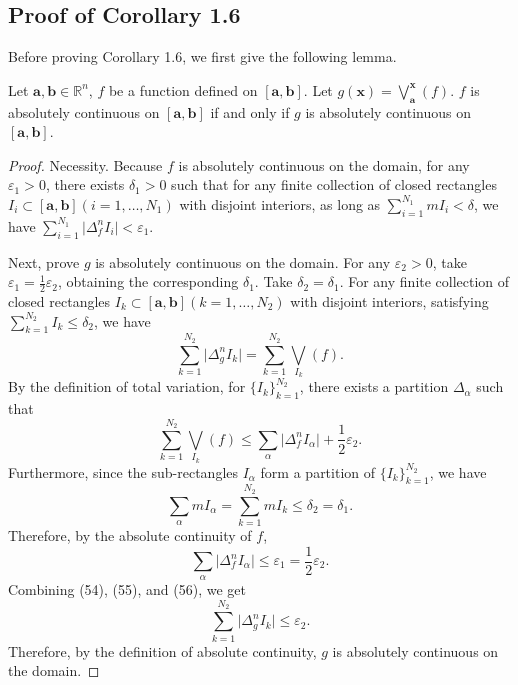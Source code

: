 \documentclass{ijclclp}
\begin{document}
\subsection{Proof of Corollary 1.6}
Before proving Corollary 1.6, we first give the following lemma.
\begin{lemma}
    Let \(\boldsymbol{a},\boldsymbol{b}\in\mathbb{R}^n\), \(f\) be a function defined on \([\boldsymbol{a},\boldsymbol{b}]\). Let \(g(\boldsymbol{x})=\bigvee\limits_{\boldsymbol{a}}^{\boldsymbol{x}}(f)\). \(f\) is absolutely continuous on \([\boldsymbol{a},\boldsymbol{b}]\) if and only if \(g\) is absolutely continuous on \([\boldsymbol{a},\boldsymbol{b}]\).
\end{lemma}
\begin{proof}
    Necessity. Because \(f\) is absolutely continuous on the domain, for any \(\varepsilon_1>0\), there exists \(\delta_1>0\) such that for any finite collection of closed rectangles \(I_i\subset[\boldsymbol{a},\boldsymbol{b}](i=1,\dots,N_1)\) with disjoint interiors, as long as \(\sum\limits_{i=1}^{N_1}mI_i<\delta\), we have
    \(\sum\limits_{i=1}^{N_1}\lvert\Delta_f^nI_i\rvert<\varepsilon_1\).

    Next, prove \(g\) is absolutely continuous on the domain. For any \(\varepsilon_2>0\), take \(\varepsilon_1=\frac{1}{2}\varepsilon_2\), obtaining the corresponding \(\delta_1\). Take \(\delta_2=\delta_1\). For any finite collection of closed rectangles \(I_k\subset[\boldsymbol{a},\boldsymbol{b}](k=1,\dots,N_2)\) with disjoint interiors, satisfying \(\sum\limits_{k=1}^{N_2}I_k\leq\delta_2\), we have
    \begin{equation}
        \sum_{k=1}^{N_2}\lvert\Delta_g^nI_k\rvert=\sum_{k=1}^{N_2}\bigvee_{I_k}(f).
    \end{equation}
    By the definition of total variation, for \(\{I_k\}_{k=1}^{N_2}\), there exists a partition \(\Delta_{\alpha}\) such that
    \begin{equation}
        \sum_{k=1}^{N_2}\bigvee_{I_k}(f)\leq\sum_{\alpha}\lvert\Delta_f^nI_{\alpha}\rvert+\frac{1}{2}\varepsilon_2.
    \end{equation}
    Furthermore, since the sub-rectangles \(I_\alpha\) form a partition of \(\{I_k\}_{k=1}^{N_2}\), we have
    \[\sum_\alpha mI_{\alpha}=\sum_{k=1}^{N_2}mI_k\leq\delta_2=\delta_1.\]
    Therefore, by the absolute continuity of \(f\),
    \begin{equation}
        \sum_\alpha\lvert\Delta_f^nI_{\alpha}\rvert\leq\varepsilon_1=\frac{1}{2}\varepsilon_2.
    \end{equation}
    Combining (54), (55), and (56), we get
    \[\sum_{k=1}^{N_2}\lvert\Delta_g^nI_k\rvert\leq\varepsilon_2.\]
    Therefore, by the definition of absolute continuity, \(g\) is absolutely continuous on the domain.


\end{proof}
\end{document}
